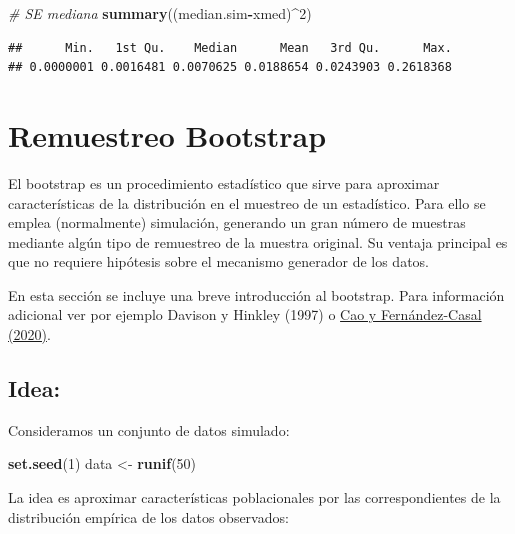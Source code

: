\documentclass[
]{book}
\newenvironment{Shaded}{\begin{snugshade}}{\end{snugshade}}
\newcommand{\CommentTok}[1]{\textcolor[rgb]{0.56,0.35,0.01}{\textit{#1}}}
\newcommand{\DecValTok}[1]{\textcolor[rgb]{0.00,0.00,0.81}{#1}}
\newcommand{\KeywordTok}[1]{\textcolor[rgb]{0.13,0.29,0.53}{\textbf{#1}}}
\newcommand{\NormalTok}[1]{#1}
\newcommand{\OperatorTok}[1]{\textcolor[rgb]{0.81,0.36,0.00}{\textbf{#1}}}
\newcommand{\StringTok}[1]{\textcolor[rgb]{0.31,0.60,0.02}{#1}}
\theoremstyle{break}
\theoremstyle{definition}
\theoremstyle{definition}
\theoremstyle{definition}
\theoremstyle{remark}
\begin{document}
\begin{enumerate}
\begin{Shaded}
\begin{Highlighting}[]
\CommentTok{# SE mediana}
\KeywordTok{summary}\NormalTok{((median.sim}\OperatorTok{-}\NormalTok{xmed)}\OperatorTok{^}\DecValTok{2}\NormalTok{) }
\end{Highlighting}
\end{Shaded}

\begin{verbatim}
##      Min.   1st Qu.    Median      Mean   3rd Qu.      Max. 
## 0.0000001 0.0016481 0.0070625 0.0188654 0.0243903 0.2618368
\end{verbatim}
\end{enumerate}

\hypertarget{remuestreo-bootstrap}{%
\section{Remuestreo Bootstrap}\label{remuestreo-bootstrap}}

El bootstrap es un procedimiento estadístico que sirve para aproximar características de la distribución en el muestreo de un estadístico.
Para ello se emplea (normalmente) simulación, generando un gran número de muestras mediante algún tipo de remuestreo de la muestra original.
Su ventaja principal es que no requiere hipótesis sobre el mecanismo generador de los datos.

En esta sección se incluye una breve introducción al bootstrap.
Para información adicional ver por ejemplo Davison y Hinkley (1997) o \href{https://rubenfcasal.github.io/book_remuestreo}{Cao y Fernández-Casal (2020)}.

\hypertarget{idea}{%
\subsection{Idea:}\label{idea}}

Consideramos un conjunto de datos simulado:

\begin{Shaded}
\begin{Highlighting}[]
\KeywordTok{set.seed}\NormalTok{(}\DecValTok{1}\NormalTok{)}
\NormalTok{data <-}\StringTok{ }\KeywordTok{runif}\NormalTok{(}\DecValTok{50}\NormalTok{)}
\end{Highlighting}
\end{Shaded}

La idea es aproximar características poblacionales por las correspondientes de la distribución empírica de los datos observados:
\end{document}
